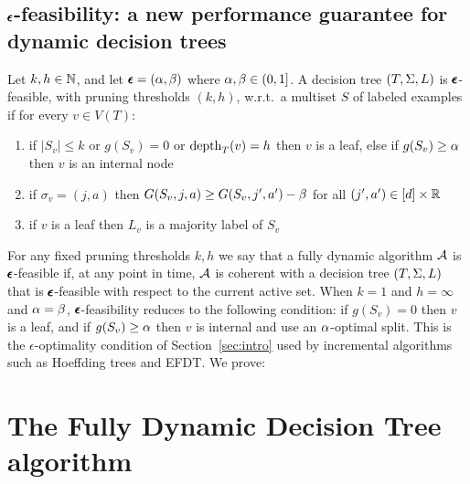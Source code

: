 \subsection{$\pmb{\epsilon}$-feasibility: a new performance guarantee for dynamic decision trees}
\begin{definition}\label{def:eps_feasibility}
Let $k,h \in \mathbb{N}$, and let $\pmb{\epsilon}=(\alpha,\beta)$ where $\alpha,\beta \in (0, 1]$. A decision tree $(T,\Sigma,L)$ is $\pmb{\epsilon}$-feasible, with pruning thresholds $(k,h)$, w.r.t.\ a multiset $S$ of labeled examples if for every $v \in V(T)$:
\begin{enumerate}
\item if $|S_v| \le k$ or $g(S_v) = 0$ or $\operatorname{depth}_T(v)=h$ then $v$ is a leaf, else if $g(S_v) \ge \alpha$ then $v$ is an internal node
\item if $\sigma_v = (j,a)$ then $G(S_v,j,a) \geq G(S_v,j',a') - \beta$ for all $(j',a') \in [d] \times \mathbb{R}$
\item if $v$ is a leaf then $L_v$ is a majority label of $S_v$
\end{enumerate}
\end{definition}
For any fixed pruning thresholds $k,h$ we say that a fully dynamic algorithm $\mathcal{A}$ is $\pmb{\epsilon}$-feasible if, at any point in time, $\mathcal{A}$ is coherent with a decision tree $(T,\Sigma,L)$ that is $\pmb{\epsilon}$-feasible with respect to the current active set. 
When $k=1$ and $h=\infty$ and $\alpha=\beta$, $\pmb{\epsilon}$-feasibility reduces to the following condition: if $g(S_v)=0$ then $v$ is a leaf, and if $g(S_v) \ge \alpha$ then $v$ is internal and use an $\alpha$-optimal split. This is the $\epsilon$-optimality condition of Section~\ref{sec:intro} used by incremental algorithms such as Hoeffding trees and EFDT.
We prove:

\section{The Fully Dynamic Decision Tree algorithm}


